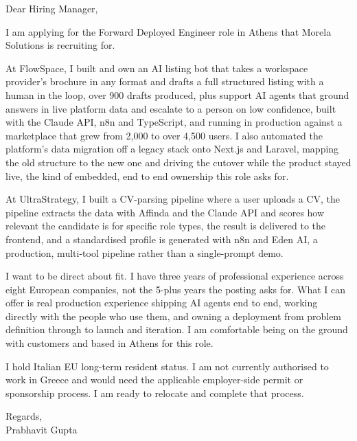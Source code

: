 \documentclass[a4paper,11pt]{article}
\begin{document}
Dear Hiring Manager,

I am applying for the Forward Deployed Engineer role in Athens that Morela Solutions is recruiting for.

At FlowSpace, I built and own an AI listing bot that takes a workspace provider's brochure in any format and drafts a full structured listing with a human in the loop, over 900 drafts produced, plus support AI agents that ground answers in live platform data and escalate to a person on low confidence, built with the Claude API, n8n and TypeScript, and running in production against a marketplace that grew from 2,000 to over 4,500 users. I also automated the platform's data migration off a legacy stack onto Next.js and Laravel, mapping the old structure to the new one and driving the cutover while the product stayed live, the kind of embedded, end to end ownership this role asks for.

At UltraStrategy, I built a CV-parsing pipeline where a user uploads a CV, the pipeline extracts the data with Affinda and the Claude API and scores how relevant the candidate is for specific role types, the result is delivered to the frontend, and a standardised profile is generated with n8n and Eden AI, a production, multi-tool pipeline rather than a single-prompt demo.

I want to be direct about fit. I have three years of professional experience across eight European companies, not the 5-plus years the posting asks for. What I can offer is real production experience shipping AI agents end to end, working directly with the people who use them, and owning a deployment from problem definition through to launch and iteration. I am comfortable being on the ground with customers and based in Athens for this role.

I hold Italian EU long-term resident status. I am not currently authorised to work in Greece and would need the applicable employer-side permit or sponsorship process. I am ready to relocate and complete that process.

Regards,\\
Prabhavit Gupta
\end{document}
